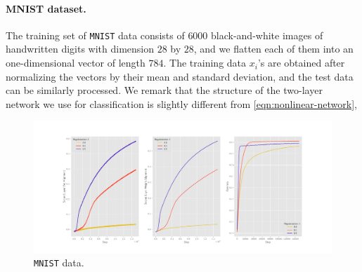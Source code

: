 \paragraph{MNIST dataset.}

The training set of \texttt{MNIST} data consists of $6000$ black-and-white images of handwritten digits with dimension $28$ by $28$, and we flatten each of them into an one-dimensional vector of length $784$. The training data $x_i$'s are obtained after normalizing the vectors by their mean and standard deviation, and the test data can be similarly processed. We remark that the structure of the two-layer network we use for classification is slightly different from \cref{eqn:nonlinear-network}, 

\begin{figure}[t]
  \centering
  \includegraphics[width=\linewidth]{figures/mnist_2l_v2_horizontal.pdf}
  \caption{\texttt{MNIST} data.}
  \label{fig:mnist}
\end{figure}